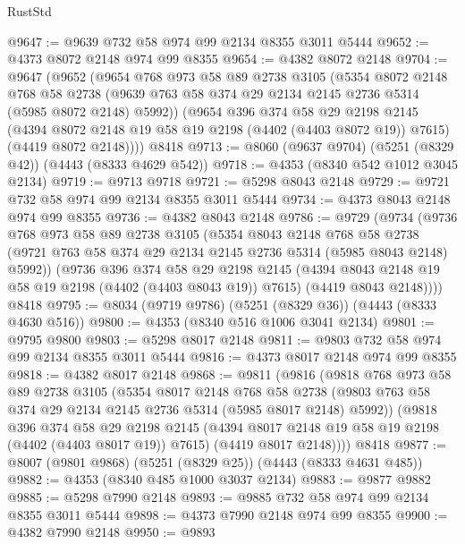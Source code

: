 \begin{lexlean}{RustStd}
\begin{coremodule}
@9647 := @9639 @732 @58 @974 @99 @2134 @8355 @3011 @5444
@9652 := @4373 @8072 @2148 @974 @99 @8355
@9654 := @4382 @8072 @2148
@9704 := @9647
    (@9652
      (@9654
        @768
        @973
        @58
        @89
        @2738
        @3105
        (@5354
          @8072
          @2148
          @768
          @58
          @2738
          (@9639 @763 @58 @374 @29 @2134 @2145 @2736 @5314 (@5985 @8072 @2148) @5992))
        (@9654
          @396
          @374
          @58
          @29
          @2198
          @2145
          (@4394 @8072 @2148 @19 @58 @19 @2198 (@4402 (@4403 @8072 @19)) @7615)
          (@4419 @8072 @2148))))
    @8418
@9713 := @8060 (@9637 @9704) (@5251 (@8329 @42)) (@4443 (@8333 @4629 @542))
@9718 := @4353 (@8340 @542 @1012 @3045 @2134)
@9719 := @9713 @9718
@9721 := @5298 @8043 @2148
@9729 := @9721 @732 @58 @974 @99 @2134 @8355 @3011 @5444
@9734 := @4373 @8043 @2148 @974 @99 @8355
@9736 := @4382 @8043 @2148
@9786 := @9729
    (@9734
      (@9736
        @768
        @973
        @58
        @89
        @2738
        @3105
        (@5354
          @8043
          @2148
          @768
          @58
          @2738
          (@9721 @763 @58 @374 @29 @2134 @2145 @2736 @5314 (@5985 @8043 @2148) @5992))
        (@9736
          @396
          @374
          @58
          @29
          @2198
          @2145
          (@4394 @8043 @2148 @19 @58 @19 @2198 (@4402 (@4403 @8043 @19)) @7615)
          (@4419 @8043 @2148))))
    @8418
@9795 := @8034 (@9719 @9786) (@5251 (@8329 @36)) (@4443 (@8333 @4630 @516))
@9800 := @4353 (@8340 @516 @1006 @3041 @2134)
@9801 := @9795 @9800
@9803 := @5298 @8017 @2148
@9811 := @9803 @732 @58 @974 @99 @2134 @8355 @3011 @5444
@9816 := @4373 @8017 @2148 @974 @99 @8355
@9818 := @4382 @8017 @2148
@9868 := @9811
    (@9816
      (@9818
        @768
        @973
        @58
        @89
        @2738
        @3105
        (@5354
          @8017
          @2148
          @768
          @58
          @2738
          (@9803 @763 @58 @374 @29 @2134 @2145 @2736 @5314 (@5985 @8017 @2148) @5992))
        (@9818
          @396
          @374
          @58
          @29
          @2198
          @2145
          (@4394 @8017 @2148 @19 @58 @19 @2198 (@4402 (@4403 @8017 @19)) @7615)
          (@4419 @8017 @2148))))
    @8418
@9877 := @8007 (@9801 @9868) (@5251 (@8329 @25)) (@4443 (@8333 @4631 @485))
@9882 := @4353 (@8340 @485 @1000 @3037 @2134)
@9883 := @9877 @9882
@9885 := @5298 @7990 @2148
@9893 := @9885 @732 @58 @974 @99 @2134 @8355 @3011 @5444
@9898 := @4373 @7990 @2148 @974 @99 @8355
@9900 := @4382 @7990 @2148
@9950 := @9893

\end{coremodule}
\end{lexlean}
